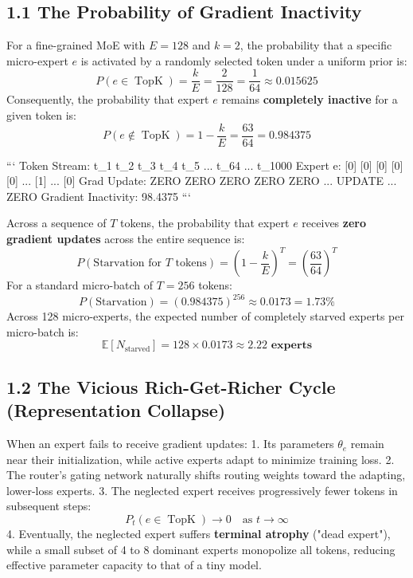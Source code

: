 \documentclass[11pt,twoside,openright]{amsbook}
\begin{document}
{{{{{{{{\subsection{1.1 The Probability of Gradient Inactivity}

For a fine-grained MoE with $E = 128$ and $k = 2$, the probability that a specific micro-expert $e$ is activated by a randomly selected token under a uniform prior is:
$$P(e \in \operatorname{TopK}) = \frac{k}{E} = \frac{2}{128} = \frac{1}{64} \approx 0.015625$$
Consequently, the probability that expert $e$ remains \textbf{completely inactive} for a given token is:
$$P(e \notin \operatorname{TopK}) = 1 - \frac{k}{E} = \frac{63}{64} = \mathbf{0.984375}$$

```
Token Stream:  t_1   t_2   t_3   t_4   t_5   ...   t_64   ...   t_1000
Expert e:      [0]   [0]   [0]   [0]   [0]   ...   [1]    ...   [0]
Grad Update:  ZERO  ZERO  ZERO  ZERO  ZERO   ...  UPDATE  ...  ZERO
Gradient Inactivity: 98.4375%
```

Across a sequence of $T$ tokens, the probability that expert $e$ receives \textbf{zero gradient updates} across the entire sequence is:
$$P(\text{Starvation for } T \text{ tokens}) = \left( 1 - \frac{k}{E} \right)^T = \left(\frac{63}{64}\right)^T$$
For a standard micro-batch of $T = 256$ tokens:
$$P(\text{Starvation}) = (0.984375)^{256} \approx \mathbf{0.0173} = \mathbf{1.73\%}$$
Across 128 micro-experts, the expected number of completely starved experts per micro-batch is:
$$\mathbb{E}[N_{\text{starved}}] = 128 \times 0.0173 \approx \mathbf{2.22 \text{ experts}}$$

\subsection{1.2 The Vicious Rich-Get-Richer Cycle (Representation Collapse)}

When an expert fails to receive gradient updates:
1. Its parameters $\theta_e$ remain near their initialization, while active experts adapt to minimize training loss.
2. The router's gating network naturally shifts routing weights toward the adapting, lower-loss experts.
3. The neglected expert receives progressively fewer tokens in subsequent steps:
   $$P_t(e \in \operatorname{TopK}) \to 0 \quad \text{as } t \to \infty$$
4. Eventually, the neglected expert suffers \textbf{terminal atrophy} ("dead expert"), while a small subset of 4 to 8 dominant experts monopolize all tokens, reducing effective parameter capacity to that of a tiny model.

}}}}}}}}
\end{document}
